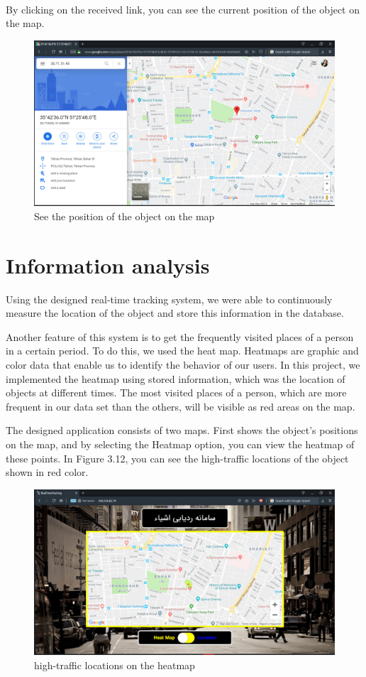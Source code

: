\\
By clicking on the received link, you can see the current position of the object on the map. \\
\begin{figure}[!h]
	\centerline{\includegraphics[width=.8\textwidth]{map}}
	\caption{See the position of the object on the map}
\end{figure}
\newpage
\section{Information analysis} 
Using the designed real-time tracking system, we were able to continuously measure the location of the object and store this information in the database.

Another feature of this system is to get the frequently visited places of a person in a certain period. To do this, we used the heat map. 
Heatmaps are graphic and color data that enable us to identify the behavior of our users. In this project, we implemented the heatmap using stored information, which was the location of objects at different times. The most visited places of a person, which are more frequent in our data set than the others, will be visible as red areas on the map.

The designed application consists of two maps. ّFirst shows the object's positions on the map, and by selecting the Heatmap option, you can view the heatmap of these points. In Figure 3.12, you can see the high-traffic locations of the object shown in red color.

\begin{figure}[!h]
	\centerline{\includegraphics[width=.9\textwidth]{heatmap2}}
	\caption{high-traffic locations on the heatmap}
\end{figure}
